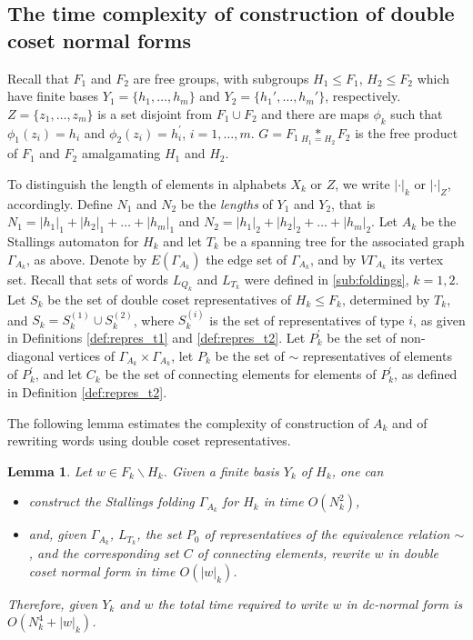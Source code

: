 \documentclass[a4paper,12pt]{article}
\newcommand{\G}{\Gamma }
\newtheorem{lemma}[theorem]{Lemma}
\numberwithin{equation}{section}
\numberwithin{figure}{section}
\begin{document}
\subsection{The time complexity of construction of double coset normal forms}\label{sub:doubleCo_nf}

Recall that $F_1$ and  $F_2$ are free groups, with subgroups $H_1 \leq
F_1$, $H_2 \leq F_2$ which have finite bases $Y_1 = \{h_1, \ldots, h_m
\}$ and $Y_2=\{h_1', \ldots, h_m'\}$, respectively.  $Z=\{z_1,\ldots ,z_m\}$
is a set disjoint from $F_1\cup F_2$ and there are
maps $\phi_k$ such that $\phi_1(z_i)=h_i$ and
$\phi_2(z_i)=h^\prime_i$, $i=1,\ldots ,m$.
 $G = F_1 \underset{H_1=H_2}{\ast} F_2$ is the free product of $F_1$ and $F_2$
amalgamating $H_1$ and $H_2$.

To distinguish the length of elements in alphabets $X_k$ or
$Z$, we write $|\cdot|_k$ or $|\cdot|_Z$, accordingly. Define  $N_1$ and $N_2$
be the \emph{lengths} of $Y_1$ and $Y_2$, that is
$N_1 = |h_1|_1 + |h_2|_1 + \ldots + |h_m|_1$ and $N_2 = |h_1|_2 +
|h_2|_2 + \ldots + |h_m|_2$. Let $A_k$ be the Stallings automaton
for $H_k$ and let $T_k$ be a spanning tree for the associated
graph $\G_{A_k}$, as above. Denote by $E(\G_{A_k})$ the  edge set
of $\G_{A_k}$, and by $V\G_{A_k}$  its vertex set.
Recall that sets of words  $L_{Q_k}$ and $L_{T_k}$
were defined in \ref{sub:foldings}, $k=1,2$. Let $S_k$ be the set of
double coset representatives of $H_k\le F_k$, determined by $T_k$, and
 $S_k=S_k^{(1)}\cup S_k^{(2)}$, where $S_k^{(i)}$ is the set
of representatives of type $i$, as given in Definitions \ref{def:repres_t1}
and \ref{def:repres_t2}.  Let $P_k^\prime$ be the set of non-diagonal
vertices of $\G_{A_k}\times \G_{A_k}$, let $P_k$ be the set of
$\sim$ representatives of elements of $P_k^\prime$, and let $C_k$ be
the set of connecting elements for elements of $P_k^\prime$, as defined in
Definition \ref{def:repres_t2}.


The following lemma estimates the complexity of
construction of $A_k$ and of rewriting words using
double coset representatives.
\begin{lemma}\label{lem:dctransversal} Let $w \in F_k \smallsetminus H_k$. Given a finite basis $Y_k$ of $H_k$, one can
\begin{itemize}
\item construct the Stallings folding $\G_{A_k}$ for $H_k$ in time $O(N_k^2)$,
\item and, given $\G_{A_k}$, $L_{T_k}$, the set $P_0$  of
 representatives of the equivalence relation $\sim$, and the
corresponding  set $C$ of connecting elements,
rewrite $w$ in  double coset normal
form in time  $O(|w|_k)$.
\end{itemize}
Therefore, given $Y_k$ and $w$ the total time required to write $w$ in dc-normal
 form is  $O(N_k^4 + |w|_k)$.
\end{lemma}
\end{document}
